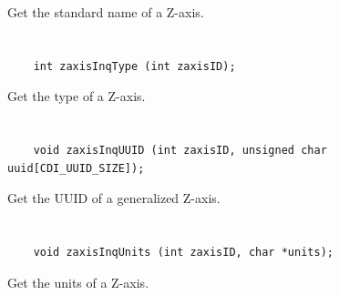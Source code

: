 Get the standard name of a Z-axis.


\section*{\tt {}}

\begin{verbatim}
    int zaxisInqType (int zaxisID);
\end{verbatim}

Get the type of a Z-axis.


\section*{\tt {}}

\begin{verbatim}
    void zaxisInqUUID (int zaxisID, unsigned char uuid[CDI_UUID_SIZE]);
\end{verbatim}

Get the UUID of a generalized Z-axis.


\section*{\tt {}}

\begin{verbatim}
    void zaxisInqUnits (int zaxisID, char *units);
\end{verbatim}

Get the units of a Z-axis.


